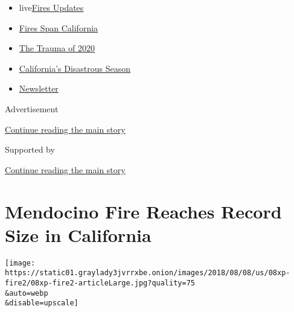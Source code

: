 \begin{itemize}
\tightlist
\item
  live\href{https://www.nytimes3xbfgragh.onion/2020/09/08/us/wildfires-live-updates.html?name=styln-california-wildfires\&region=TOP_BANNER\&block=storyline_menu_recirc\&action=click\&pgtype=Article\&impression_id=cb5d8831-f2ad-11ea-9b15-cd32a6585360\&variant=undefined}{Fires
  Updates}
\item
  \href{https://www.nytimes3xbfgragh.onion/2020/09/07/us/ca-wildfires-heatwave.html?name=styln-california-wildfires\&region=TOP_BANNER\&block=storyline_menu_recirc\&action=click\&pgtype=Article\&impression_id=cb5d8832-f2ad-11ea-9b15-cd32a6585360\&variant=undefined}{Fires
  Span California}
\item
  \href{https://www.nytimes3xbfgragh.onion/2020/08/26/us/california-wildfires-lake-berryessa.html?name=styln-california-wildfires\&region=TOP_BANNER\&block=storyline_menu_recirc\&action=click\&pgtype=Article\&impression_id=cb5daf40-f2ad-11ea-9b15-cd32a6585360\&variant=undefined}{The
  Trauma of 2020}
\item
  \href{https://www.nytimes3xbfgragh.onion/article/why-does-california-have-wildfires.html?name=styln-california-wildfires\&region=TOP_BANNER\&block=storyline_menu_recirc\&action=click\&pgtype=Article\&impression_id=cb5daf41-f2ad-11ea-9b15-cd32a6585360\&variant=undefined}{California's
  Disastrous Season}
\item
  \href{https://www.nytimes3xbfgragh.onion/2020/09/08/us/california-wildfire-heat-wave.html?name=styln-california-wildfires\&region=TOP_BANNER\&block=storyline_menu_recirc\&action=click\&pgtype=Article\&impression_id=cb5daf42-f2ad-11ea-9b15-cd32a6585360\&variant=undefined}{Newsletter}
\end{itemize}

Advertisement

\protect\hyperlink{after-top}{Continue reading the main story}

Supported by

\protect\hyperlink{after-sponsor}{Continue reading the main story}

\hypertarget{mendocino-fire-reaches-record-size-in-california}{%
\section{Mendocino Fire Reaches Record Size in
California}\label{mendocino-fire-reaches-record-size-in-california}}

\texttt{[image: https://static01.graylady3jvrrxbe.onion/images/2018/08/08/us/08xp-fire2/08xp-fire2-articleLarge.jpg?quality=75\\\&auto=webp\\\&disable=upscale]}

